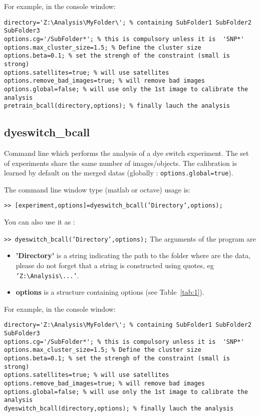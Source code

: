 \documentclass{scrartcl}
\begin{document}
For example, in the console window:
\begin{lstlisting}
directory='Z:\Analysis\MyFolder\'; % containing SubFolder1 SubFolder2 SubFolder3
options.cg='/SubFolder*'; % this is compulsory unless it is  'SNP*'
options.max_cluster_size=1.5; % Define the cluster size
options.beta=0.1; % set the strengh of the constraint (small is strong)
options.satellites=true; % will use satellites
options.remove_bad_images=true; % will remove bad images
options.global=false; % will use only the 1st image to calibrate the analysis
pretrain_bcall(directory,options); % finally lauch the analysis
\end{lstlisting}


\subsection{dyeswitch\_bcall}
Command line which performs the analysis of a dye switch
experiment. The set of experiments share the same number of
images/objects. The calibration is learned by default on the merged
datas (globally : \texttt{options.global=true}).

The command line window type (matlab or octave) usage is:

\texttt{>> [experiment,options]=dyeswitch\_bcall('Directory',options);}

You can also use it as :

\texttt{>> dyeswitch\_bcall('Directory',options);}
The arguments of the program are 
\begin{itemize}
\item \textbf{'Directory'} is a string indicating the path to the folder
  where are the data, please do not forget that a string is
  constructed using quotes, eg
  \texttt{'Z:{\textbackslash}Analysis{\textbackslash}...'}.
\item \textbf{options} is a structure containing options (see
  Table~\ref{tab:1}).
\end{itemize}

For example, in the console window:
\begin{lstlisting}
directory='Z:\Analysis\MyFolder\'; % containing SubFolder1 SubFolder2 SubFolder3
options.cg='/SubFolder*'; % this is compulsory unless it is  'SNP*'
options.max_cluster_size=1.5; % Define the cluster size
options.beta=0.1; % set the strengh of the constraint (small is strong)
options.satellites=true; % will use satellites
options.remove_bad_images=true; % will remove bad images
options.global=false; % will use only the 1st image to calibrate the analysis
dyeswitch_bcall(directory,options); % finally lauch the analysis
\end{lstlisting}
\end{document}
